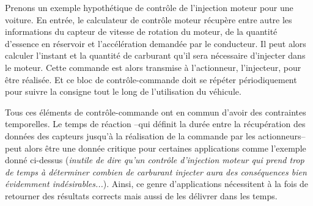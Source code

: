 \documentclass[french, a4paper, 11pt, twoside, pdftex]{StyleThese}
\begin{document}
		Prenons un exemple hypothétique de contrôle de l'injection moteur pour une voiture. En entrée, le calculateur de contrôle moteur récupère entre autre les informations du capteur de vitesse de rotation du moteur, de la quantité d'essence en réservoir et l'accélération demandée par le conducteur. Il peut alors calculer l'instant et la quantité de carburant qu'il sera nécessaire d'injecter dans le moteur. Cette commande est alors transmise à l'actionneur, l'injecteur, pour être réalisée. Et ce bloc de contrôle-commande doit se répéter périodiquement pour suivre la consigne tout le long de l'utilisation du véhicule.
		
		Tous ces éléments de contrôle-commande ont en commun d'avoir des contraintes temporelles. Le temps de réaction --qui définit la durée entre la récupération des données des capteurs jusqu'à la réalisation de la commande par les actionneurs--  peut alors être une donnée critique pour certaines applications comme l'exemple donné ci-dessus (\textit{inutile de dire qu'un contrôle d'injection moteur qui prend trop de temps à déterminer combien de carburant injecter aura des conséquences bien évidemment indésirables...}). Ainsi, ce genre d'applications nécessitent à la fois de retourner des résultats corrects mais aussi de les délivrer dans les temps. 
		
\end{document}
